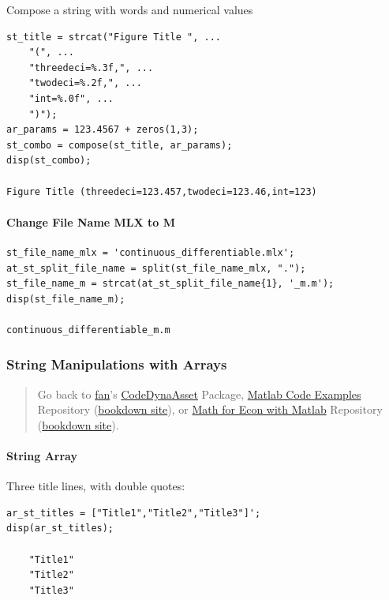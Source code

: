 \documentclass[
]{book}
\begin{document}
Compose a string with words and numerical values

\begin{verbatim}
st_title = strcat("Figure Title ", ...
    "(", ...
    "threedeci=%.3f,", ...
    "twodeci=%.2f,", ...
    "int=%.0f", ...
    ")");
ar_params = 123.4567 + zeros(1,3);
st_combo = compose(st_title, ar_params);
disp(st_combo);

Figure Title (threedeci=123.457,twodeci=123.46,int=123)
\end{verbatim}

\hypertarget{change-file-name-mlx-to-m}{%
\paragraph{Change File Name MLX to M}\label{change-file-name-mlx-to-m}}

\begin{verbatim}
st_file_name_mlx = 'continuous_differentiable.mlx';
at_st_split_file_name = split(st_file_name_mlx, ".");
st_file_name_m = strcat(at_st_split_file_name{1}, '_m.m');
disp(st_file_name_m);

continuous_differentiable_m.m
\end{verbatim}

\hypertarget{string-manipulations-with-arrays}{%
\subsubsection{String Manipulations with Arrays}\label{string-manipulations-with-arrays}}

\begin{quote}
Go back to \href{http://fanwangecon.github.io/}{fan}'s \href{https://fanwangecon.github.io/CodeDynaAsset/}{CodeDynaAsset} Package, \href{https://fanwangecon.github.io/M4Econ/}{Matlab Code Examples} Repository (\href{https://fanwangecon.github.io/M4Econ/bookdown}{bookdown site}), or \href{https://fanwangecon.github.io/Math4Econ/}{Math for Econ with Matlab} Repository (\href{https://fanwangecon.github.io/Math4Econ/bookdown}{bookdown site}).
\end{quote}

\hypertarget{string-array}{%
\paragraph{String Array}\label{string-array}}

Three title lines, with double quotes:

\begin{verbatim}
ar_st_titles = ["Title1","Title2","Title3"]';
disp(ar_st_titles);

    "Title1"
    "Title2"
    "Title3"
\end{verbatim}
\end{document}
